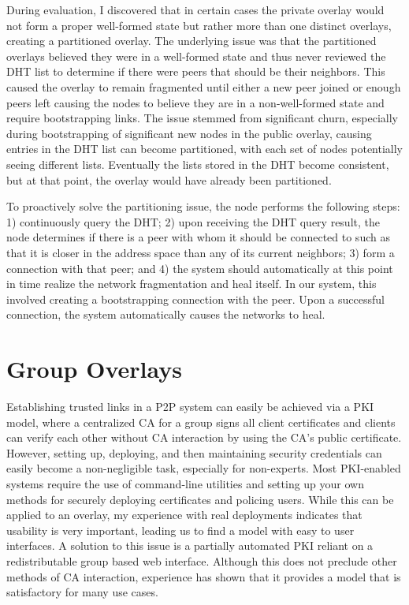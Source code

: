 During evaluation, I discovered that in certain cases the private overlay would
not form a proper well-formed state but rather more than one distinct overlays,
creating a partitioned overlay.  The underlying issue was that the partitioned
overlays believed they were in a well-formed state and thus never reviewed the
DHT list to determine if there were peers that should be their neighbors.  This
caused the overlay to remain fragmented until either a new peer joined or enough
peers left causing the nodes to believe they are in a non-well-formed state and
require bootstrapping links.  The issue stemmed from significant churn,
especially during bootstrapping of significant new nodes in the public overlay,
causing entries in the DHT list can become partitioned, with each set of nodes
potentially seeing different lists.  Eventually the lists stored in the DHT
become consistent, but at that point, the overlay would have already been
partitioned.

To proactively solve the partitioning issue, the node performs the following
steps: 1) continuously query the DHT;  2) upon receiving the DHT query result,
the node determines if there is a peer with whom it should be connected to
such as that it is closer in the address space than any of its current neighbors;
3) form a connection with that peer; and 4) the system should automatically at
this point in time realize the network fragmentation and heal itself.  In our
system, this involved creating a bootstrapping connection with the peer.  Upon
a successful connection, the system automatically causes the networks to heal.

\section{Group Overlays}
\label{group_overlays}
Establishing trusted links in a P2P system can easily be achieved via a PKI
model, where a centralized CA for a group signs all client certificates and
clients can verify each other without CA interaction by using the CA's public
certificate.  However, setting up, deploying, and then maintaining security
credentials can easily become a non-negligible task, especially for non-experts.
Most PKI-enabled systems require the use of command-line utilities and setting
up your own methods for securely deploying certificates and policing users.
While this can be applied to an overlay, my experience with real deployments
indicates that usability is very important, leading us to find a model with
easy to user interfaces.  A solution to this issue is a partially automated PKI
reliant on a redistributable group based web interface.  Although this does not
preclude other methods of CA interaction, experience has shown that it provides
a model that is satisfactory for many use cases.

